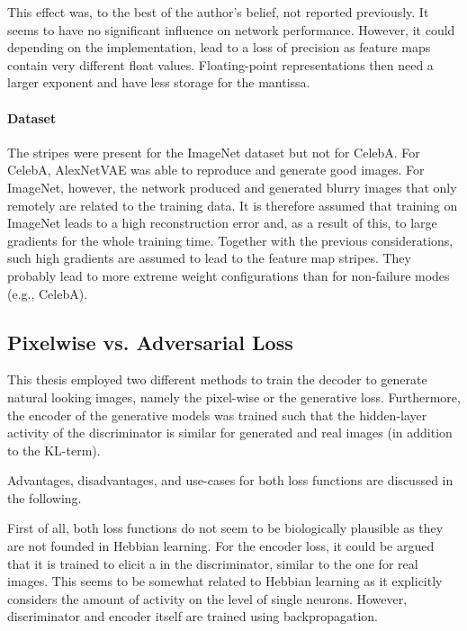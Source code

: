 This effect was, to the best of the author's belief, not reported previously.
It seems to have no significant influence on network performance.
However, it could depending on the implementation, lead to a loss of precision as feature maps contain very different float values.
Floating-point representations then need a larger exponent and have less storage for the mantissa.

\paragraph{Dataset}
The stripes were present for the ImageNet dataset but not for CelebA.
For CelebA, AlexNetVAE was able to reproduce and generate good images.
For ImageNet, however, the network produced and generated blurry images that only remotely are related to the training data.
It is therefore assumed that training on ImageNet leads to a high reconstruction error and, as a result of this, to large gradients for the whole training time.
Together with the previous considerations, such high gradients are assumed to lead to the feature map stripes.
They probably lead to more extreme weight configurations than for non-failure modes (e.g., CelebA).

\subsection{Pixelwise vs. Adversarial Loss}\label{subsec:pixelwise-vs.-adversarial-loss}
This thesis employed two different methods to train the decoder to generate natural looking images, namely the pixel-wise or the generative loss.
Furthermore, the encoder of the generative models was trained such that the hidden-layer activity of the discriminator is similar for generated and real images (in addition to the KL-term).

Advantages, disadvantages, and use-cases for both loss functions are discussed in the following.

First of all, both loss functions do not seem to be biologically plausible as they are not founded in Hebbian learning.
For the encoder loss, it could be argued that it is trained to elicit a  in the discriminator, similar to the one for real images.
This  seems to be somewhat related to Hebbian learning as it explicitly considers the amount of activity on the level of single neurons.
However, discriminator and encoder itself are trained using backpropagation.

